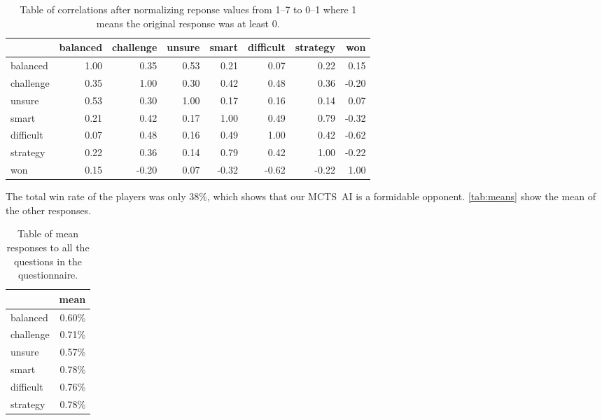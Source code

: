 \begin{table}[h]
	\centering
	\begin{tabular}{lrrrrrrr}
		\toprule
		{} &  balanced &  challenge &  unsure &  smart &  difficult &  strategy &   won \\
		\midrule
		balanced  &      1.00 &       0.35 &    0.53 &   0.21 &       0.07 &      0.22 &  0.15 \\
		challenge &      0.35 &       1.00 &    0.30 &   0.42 &       0.48 &      0.36 & -0.20 \\
		unsure    &      0.53 &       0.30 &    1.00 &   0.17 &       0.16 &      0.14 &  0.07 \\
		smart     &      0.21 &       0.42 &    0.17 &   1.00 &       0.49 &      0.79 & -0.32 \\
		difficult &      0.07 &       0.48 &    0.16 &   0.49 &       1.00 &      0.42 & \cellcolor{blue!25}-0.62 \\
		strategy  &      0.22 &       0.36 &    0.14 &   0.79 &       0.42 &      1.00 & -0.22 \\
		won       &      0.15 &      -0.20 &    0.07 &  -0.32 &      -0.62 &     -0.22 &  1.00 \\
		\bottomrule
	\end{tabular}
	\caption{Table of correlations after normalizing reponse values from 1--7 to 0--1 where 1 means the original response was at least 0.}
	\label{tab:norm-corr}
\end{table}

The total win rate of the players was only $38\%$, which shows that our MCTS~AI
is a formidable opponent. \autoref{tab:means} show the mean of the other responses.

\begin{table}[h]
	\centering
	\begin{tabular}{lr}
		\toprule
		{} & mean \\ 
		\midrule
		balanced        &       0.60\% \\
		challenge       &       0.71\% \\
		unsure  &       0.57\% \\
		smart   &       0.78\% \\
		difficult       &       0.76\% \\
		strategy        &       0.78\% \\
		\bottomrule
	\end{tabular}
	\caption{Table of mean responses to all the questions in the questionnaire.}
	\label{tab:means}
\end{table}

